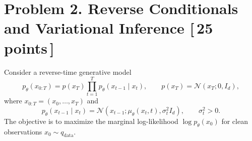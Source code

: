 \documentclass[11pt]{article}
\newcommand{\N}{\mathcal{N}}
\newcommand{\pts}[1]{\hfill\textnormal{[\,#1 points\,]}}
\begin{document}
\newpage
\section*{Problem 2. Reverse Conditionals and Variational Inference \pts{25}}

Consider a reverse-time generative model
\begin{equation}\label{eq:reverse-joint}
  p_\theta(x_{0:T})
  =p(x_T)\prod_{t=1}^{T}p_\theta(x_{t-1}\mid x_t),
  \qquad p(x_T)=\N(x_T;0,I_d),
\end{equation}
where \(x_{0:T}=(x_0,\ldots,x_T)\) and
\[
  p_\theta(x_{t-1}\mid x_t)
  =\N\!\left(x_{t-1};\mu_\theta(x_t,t),\sigma_t^2 I_d\right),
  \qquad \sigma_t^2>0.
\]
The objective is to maximize the marginal log-likelihood \(\log p_\theta(x_0)\)
for clean observations \(x_0\sim q_{\mathrm{data}}\).
\end{document}
